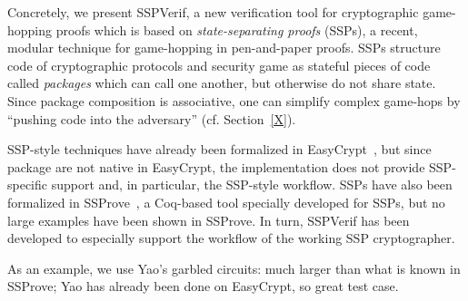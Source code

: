 Concretely, we present SSPVerif, a new verification tool for cryptographic game-hopping proofs which
is based on \emph{state-separating proofs} (SSPs), a recent, modular technique for game-hopping in pen-and-paper
proofs. SSPs structure code of cryptographic protocols and security game as stateful pieces of code
called \emph{packages} which can call one another, but otherwise do not share state. Since package
composition is associative, one can simplify complex game-hops by ``pushing code into the adversary''
(cf. Section~\ref{X}).

SSP-style techniques have already been formalized in EasyCrypt~\cite{X}, but since package are not
native in EasyCrypt, the implementation does not provide SSP-specific support and, in particular,
the SSP-style workflow. SSPs have also been formalized in SSProve~\cite{X}, a Coq-based tool specially
developed for SSPs, but no large examples have been shown in SSProve. In turn, SSPVerif has been developed
to especially support the workflow of the working SSP cryptographer.

As an example, we use Yao's garbled circuits: much larger than what is known in SSProve; Yao has already 
been done on EasyCrypt, so great test case.